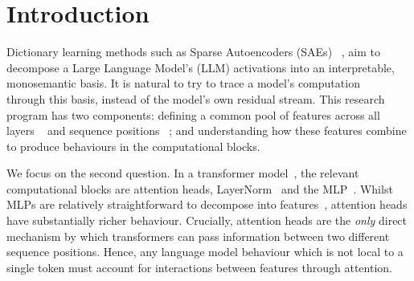 \documentclass{article}
\theoremstyle{plain}
\theoremstyle{definition}
\theoremstyle{remark}
\begin{document}
\section{Introduction}\label{sec:intro}










Dictionary learning methods such as Sparse Autoencoders (SAEs) ~\citep{cunningham2023sparse, bricken2023monosemanticity, templeton2024scaling}, aim to decompose a Large Language Model's (LLM) activations into an interpretable, monosemantic basis. It is natural to try to trace a model's computation ~\citep{marks2024sparse,kamath2025tracing} through this basis, instead of the model's own residual stream. This research program has two components: defining a common pool of features across all layers ~\citep{brickencrosscoders} and sequence positions ~\citep{bhallatsae_2025,tfa_2025}; and understanding how these features combine to produce behaviours in the computational blocks.

We focus on the second question. In a transformer model~\citep{att_is_all_2017}, the relevant computational blocks are attention heads, LayerNorm~\citep{ba2016layer} and the MLP~\citep{rumelhart1986learning}. Whilst MLPs are relatively straightforward to decompose into features~\citep{featints_compact_2025,dunefsky2024transcoders,bricken2023monosemanticity}, attention heads have substantially richer behaviour. Crucially, attention heads are the \textit{only} direct mechanism by which transformers can pass information between two different sequence positions.
Hence, any language model behaviour which is not local to a single token must account for interactions between features through attention.
\end{document}
